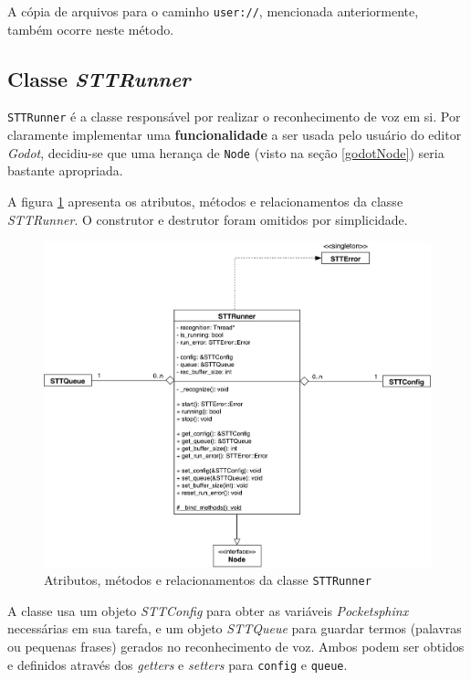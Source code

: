 A cópia de arquivos para o caminho \texttt{user://}, mencionada anteriormente, também ocorre neste método.


\subsection{Classe \textit{STTRunner}}
\label{stt-runner}

\texttt{STTRunner} é a classe responsável por realizar o reconhecimento de voz em si. Por claramente implementar uma \textbf{funcionalidade} a ser usada pelo usuário do editor \textit{Godot}, decidiu-se que uma herança de \texttt{Node} (visto na seção \ref{godotNode}) seria bastante apropriada.

A figura \ref{stt-runner-diagram} apresenta os atributos, métodos e relacionamentos da classe \textit{STTRunner}. O construtor e destrutor foram omitidos por simplicidade.

\begin{figure}[H]
  \centering
  \includegraphics[width=.9\textwidth]{image/stt-runner.pdf}
  \caption{Atributos, métodos e relacionamentos da classe \texttt{STTRunner}}
  \label{stt-runner-diagram}
\end{figure}

A classe usa um objeto \textit{STTConfig} para obter as variáveis \textit{Pocketsphinx} necessárias em sua tarefa, e um objeto \textit{STTQueue} para guardar termos (palavras ou pequenas frases) gerados no reconhecimento de voz. Ambos podem ser obtidos e definidos através dos \textit{getters} e \textit{setters} para \texttt{config} e \texttt{queue}.

